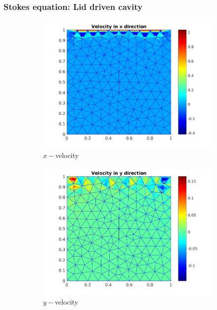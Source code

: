 \documentclass{beamer}
\begin{document}
\begin{frame}
\frametitle{Stokes equation: Lid driven cavity}
\begin{figure}
\begin{subfigure}{0.3\textwidth}	
  \includegraphics[width=\linewidth]{lid_minres_vx.jpg}
  \caption{$x-$velocity} 
  \label{x_vel_stoke_minres_lid}
\end{subfigure}
\begin{subfigure}{0.3\textwidth}	
  \includegraphics[width=\linewidth]{lid_minres_vy.jpg}
  \caption{$y-$velocity} 
  \label{y_vel_stoke_minres_lid}
\end{subfigure}
\begin{subfigure}{0.3\textwidth}	

\end{subfigure}
\end{figure}
\end{frame}
\end{document}
